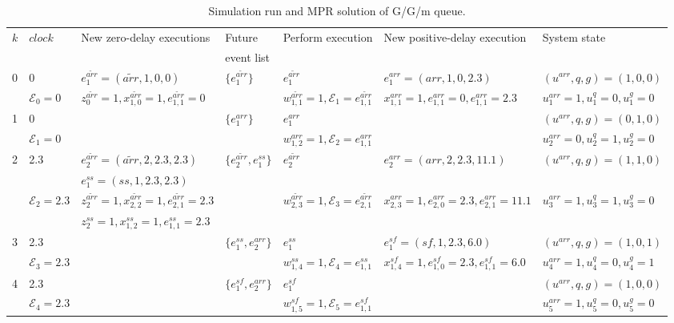 \documentclass[]{interact}
\theoremstyle{plain}%
\theoremstyle{definition}
\theoremstyle{remark}
\begin{document}
\begin{landscape}
\begin{table}
	\caption{Simulation run and MPR solution of G/G/m queue.}
	\label{tab:sol_GGM}
	\begin{tabular}{lllllll}
		\hline
		$k$&$clock$&New zero-delay executions& Future  &Perform execution  &New positive-delay execution&System state \\
		&&&  event list &  && \\\hline
		
		
		0 & 0 & $e^{\tilde{arr}}_1=({\tilde{arr}},1,0,0)$ &$\{e^{\tilde{arr}}_1\}$&$e^{\tilde{arr}}_1$&$e^{{arr}}_1=({{arr}},1,0,2.3)$&$(u^{arr},q,g)=(1,0,0)$\\
		   & $\mathcal{E}_0=0$& $z^{\tilde{arr}}_0=1, x^{\tilde{arr}}_{1,0}=1,e^{\tilde{arr}}_{1,1}=0$ &&$w^{\tilde{arr}}_{1,1}=1,\mathcal{E}_1=e^{\tilde{arr}}_{1,1}$& 
		   $x^{{arr}}_{1,1}=1, e^{{arr}}_{1,1}=0, e^{{arr}}_{1,1}=2.3$ &$u^{arr}_1=1,u^{q}_1=0,u^{g}_1=0$\\\hline
		   
		   
		1 & 0 & &$\{e^{{arr}}_1\}$&$e^{{arr}}_1$&&$(u^{arr},q,g)=(0,1,0)$\\
		 &$\mathcal{E}_1=0$&&&$w^{{arr}}_{1,2}=1,\mathcal{E}_2=e^{{arr}}_{1,1}$&&$u^{arr}_2=0,u^{q}_2=1,u^{g}_2=0$\\\hline
		 
		 
	    2 &2.3 &$e^{\tilde{arr}}_2=({\tilde{arr}},2,2.3,2.3)$&$\{e^{\tilde{arr}}_2,e^{ss}_1\}$ &$e^{\tilde{arr}}_2$ &$e^{{arr}}_2=({{arr}},2,2.3,11.1)$ &$(u^{arr},q,g)=(1,1,0)$\\
	    &&$e^{ss}_1=(ss,1,2.3,2.3)$&&&&\\
	    &$\mathcal{E}_2=2.3$&$z^{\tilde{arr}}_2=1, x^{\tilde{arr}}_{2,2}=1,e^{\tilde{arr}}_{2,1}=2.3$&&$w^{\tilde{arr}}_{2,3}=1,\mathcal{E}_3=e^{\tilde{arr}}_{2,1}$&$x^{{arr}}_{2,3}=1, e^{{arr}}_{2,0}=2.3, e^{{arr}}_{2,1}=11.1$&$u^{arr}_3=1,u^{q}_3=1,u^{g}_3=0$\\
	    &&$z^{ss}_2=1,x^{ss}_{1,2}=1,e^{ss}_{1,1}=2.3$ &&&&\\\hline
	    
	    
	    3 & 2.3& & $\{e^{ss}_1,e^{arr}_2\}$&$e^{ss}_1$&$e^{sf}_1=(sf,1,2.3,6.0)$&$(u^{arr},q,g)=(1,0,1)$\\
	    &$\mathcal{E}_3=2.3$&&&$w^{{ss}}_{1,4}=1,\mathcal{E}_4=e^{{ss}}_{1,1}$&$x^{{sf}}_{1,4}=1, e^{{sf}}_{1,0}=2.3, e^{{sf}}_{1,1}=6.0$&$u^{arr}_4=1,u^{q}_4=0,u^{g}_4=1$\\\hline
	    
	    
	    4 & 2.3&&$\{e^{sf}_1,e^{arr}_2\}$&$e^{sf}_{1}$&&$(u^{arr},q,g)=(1,0,0)$\\
	     &$\mathcal{E}_4=2.3$&&&$w^{{sf}}_{1,5}=1,\mathcal{E}_5=e^{{sf}}_{1,1}$&&$u^{arr}_5=1,u^{q}_5=0,u^{g}_5=0$\\\hline
	     

\end{tabular}
\end{table}
\end{landscape}
\end{document}
